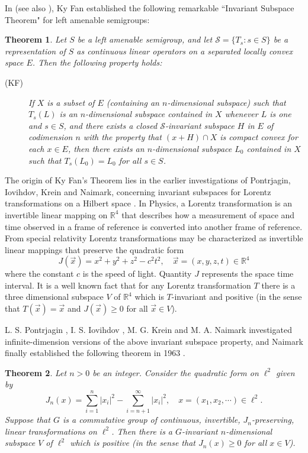 \documentclass{tran-l}
\numberwithin{equation}{section}
\newtheorem*{theom}{Theorem}
\theoremstyle{definition}
\theoremstyle{remark}
\begin{document}
In \cite{K3} (see also \cite{K1,K2,Lau_invar, L-P-W,Lau-Wong}), Ky Fan established the following remarkable ``Invariant Subspace Theorem" for left amenable semigroups:
\begin{theom}
Let $S$ be a left amenable semigroup, and let ${\mathcal{S}} = \{T_s: s\in S\}$ be a representation of $S$ as continuous linear operators on a separated locally convex space $E$. Then the following property holds:
\begin{description}
\item[(KF)]\label{K} If $X$ is a subset of $E$ (containing an $n$-dimensional subspace) such that $T_s(L)$ is an $n$-dimensional subspace contained in $X$ whenever $L$ is one and $s\in S$, and there exists a closed ${\mathcal{S}}$-invariant subspace $H$ in $E$ of codimension $n$ with the property that $(x+H)\cap X$ is compact convex for each $x\in E$, then there exists an $n$-dimensional subspace $L_0$ contained in $X$ such that $T_s(L_0) = L_0$ for all $s\in S$.
\end{description}
\end{theom}
The origin of Ky Fan's Theorem lies in the earlier investigations of Pontrjagin, Iovihdov, Krein and Naimark, concerning invariant subspaces for Lorentz transformations on a Hilbert space \cite{Iohv,I-K, Krein, Naimark1, Naimark2, Pontr}. In Physics, a Lorentz transformation is an invertible linear mapping on ${\mathbb{R}}^4$ that describes how a measurement of space and time observed in a frame of reference is converted into another frame of reference. From special relativity Lorentz transformations may be characterized as invertible linear mappings that preserve the quadratic form
\[ 
J(\vec x) = x^2 + y^2 + z^2 - c^2 t^2, \quad \vec x = (x, y, z, t)\in {\mathbb{R}}^4
\]
where the constant $c$ is the speed of light.
Quantity $J$ represents the space time interval. 
 It is a well known fact that for any Lorentz transformation $T$ there is a three dimensional subspace $V$ of ${\mathbb{R}}^4$ which is $T$-invariant and  positive (in the sense that $T(\vec x) = \vec x$ and $J(\vec x)\geq 0$ for all $\vec x \in V$). 
 
L. S. Pontrjagin \cite{Pontr}, I. S. Iovihdov \cite{Iohv}, M. G. Krein \cite{Krein, I-K} and M. A. Naimark \cite{Naimark1,Naimark2} investigated infinite-dimension versions of the above invariant subspace property, and Naimark finally established the following theorem in 1963 \cite{Naimark1}.
\begin{theom}
Let $n>0$ be an integer. Consider the quadratic form on $\ell^2$ given by
\[
J_n(x) = \sum_{i=1}^n|x_i|^2 - \sum_{i=n+1}^\infty |x_i|^2, \quad x=(x_1,x_2,\cdots)\in \ell^2.
\]
Suppose that $G$ is a commutative group of continuous,  invertible, $J_n$-preserving, linear transformations on $\ell^2$. Then there is a $G$-invariant $n$-dimensional subspace $V$ of $\ell^2$ which is positive (in the sense that $J_n(x) \geq 0$ for all $x\in V$).
\end{theom}
 
\end{document}
